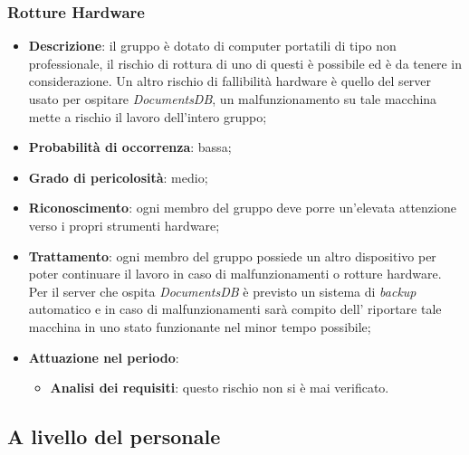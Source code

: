 		\subsubsection{Rotture Hardware}
		\begin{itemize}
			\item \textbf{Descrizione}: il gruppo è dotato di computer portatili di tipo non professionale, il rischio di rottura di uno di questi è possibile ed è da tenere in considerazione. Un altro rischio di fallibilità hardware è quello del server usato per ospitare \textit{DocumentsDB}, un malfunzionamento su tale macchina mette a rischio il lavoro dell'intero gruppo;
			\item \textbf{Probabilità di occorrenza}: bassa;
			\item \textbf{Grado di pericolosità}: medio;
			\item \textbf{Riconoscimento}: ogni membro del gruppo deve porre un'elevata attenzione verso i propri strumenti hardware;	
			\item \textbf{Trattamento}: ogni membro del gruppo possiede un altro dispositivo per poter continuare il lavoro in caso di malfunzionamenti o rotture hardware. Per il server che ospita \textit{DocumentsDB} è previsto un sistema di \textit{backup} automatico e in caso di malfunzionamenti sarà compito dell'\textit{\Amm} riportare tale macchina in uno stato funzionante nel minor tempo possibile;
			\item \textbf{Attuazione nel periodo}:
			\begin{itemize}
				\item \textbf{Analisi dei requisiti}: questo rischio non si è mai verificato.
			\end{itemize}
		\end{itemize}	
	
	\subsection{A livello del personale}
	
